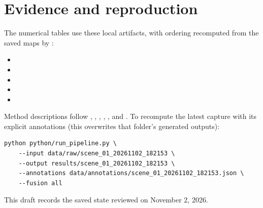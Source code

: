 \documentclass[11pt]{article}
\begin{document}
\section{Evidence and reproduction}

The numerical tables use these local artifacts, with ordering recomputed from the saved maps by :

\begin{itemize}
\item {}
\item {}
\item {}
\item {}
\item {}
\end{itemize}

Method descriptions follow , , , , , and . To recompute the latest capture with its explicit annotations (this overwrites that folder's generated outputs):

\begin{lstlisting}[basicstyle=\ttfamily\small,breaklines=true,columns=fullflexible]
python python/run_pipeline.py \
    --input data/raw/scene_01_20261102_182153 \
    --output results/scene_01_20261102_182153 \
    --annotations data/annotations/scene_01_20261102_182153.json \
    --fusion all
\end{lstlisting}

This draft records the saved state reviewed on November 2, 2026.
\end{document}
